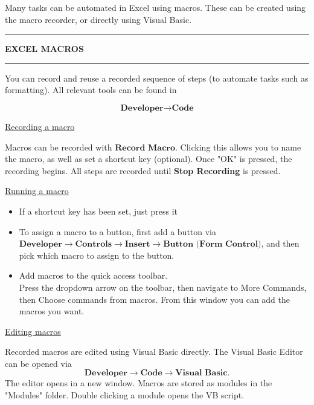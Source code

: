 \documentclass[8pt]{extarticle}
\newcommand{\heading}[1]{%
    \noindent
    \rule{\linewidth}{0.4pt}
    \begin{center}
        \vspace{-1ex}
        \textbf{#1}        
        \vspace{-2.5ex}
    \end{center}
    \rule{\linewidth}{0.4pt}
}
\begin{document}
\begin{multicols}{3}
\setlength{\columnseprule}{1pt} %

Many tasks can be automated in Excel using macros. These can be created using the macro recorder, or directly using Visual Basic.

\heading{EXCEL MACROS}

You can record and reuse a recorded sequence of steps (to automate tasks such as formatting). All relevant tools can be found in 

\[\textbf{Developer} \rightarrow \textbf{Code}\]

\begin{center}
    \underline{Recording a macro}
\end{center}

Macros can be recorded with $\textbf{Record Macro}$. Clicking this allows you to name the macro, as well as set a shortcut key (optional). Once "OK" is pressed, the recording begins. All steps are recorded until \textbf{Stop Recording} is pressed.

\begin{center}
    \underline{Running a macro}
\end{center}

\begin{itemize}
    \item If a shortcut key has been set, just press it
    \item To assign a macro to a button, first add a button via \\
    $\textbf{Developer} \rightarrow \textbf{Controls} \rightarrow \textbf{Insert} \rightarrow \textbf{Button (Form Control)}$,
    and then pick which macro to assign to the button. 
    \item Add macros to the quick access toolbar. \\
    Press the dropdown arrow on the toolbar, then navigate to More Commands, then Choose commands from macros. From this window you can add the macros you want.
\end{itemize}

\begin{center}
    \underline{Editing macros}
\end{center}

Recorded macros are edited using Visual Basic directly. The Visual Basic Editor can be opened via
\[\textbf{Developer} \rightarrow \textbf{Code} \rightarrow \textbf{Visual Basic}. \]
The editor opens in a new window. Macros are stored as modules in the "Modules" folder. Double clicking a module opens the VB script.


\end{multicols}
\end{document}
